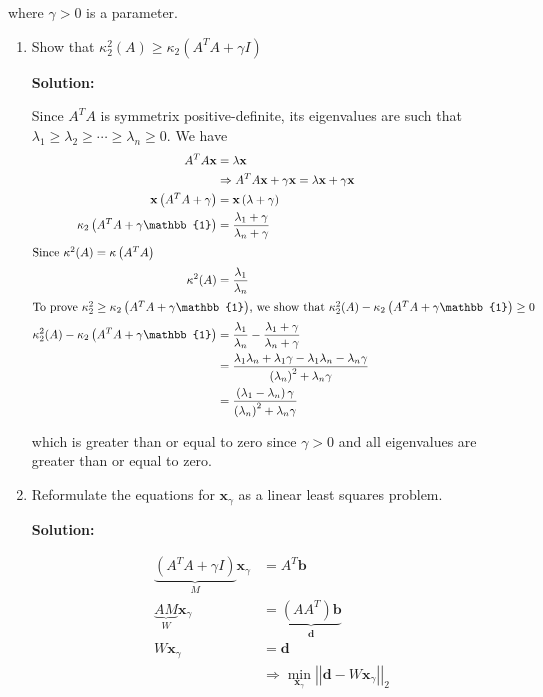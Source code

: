 \documentclass[12pt]{article}
\newcommand{\norm}[1]{\left|\left| #1 \right|\right|}
\newcommand{\vect}{\mathbf}
\newcommand{\Id}{\mathbb{1}}
\renewcommand{\P}[1]{\left( #1 \right)}
\begin{document}
\begin{enumerate}
where $\gamma > 0$ is a parameter.

\begin{enumerate}
  \item Show that $\kappa_{2}^{2}(A) \geq \kappa_{2}\left( A^{T}A + \gamma I \right)$

  {\bf Solution:}

  Since $A^{T}A$ is symmetrix positive-definite, its eigenvalues are such that
  $\lambda_{1} \geq \lambda_{2} \geq \cdots \geq \lambda_{n} \geq 0$. We have
  \begin{align*}
    A^{T}A\vect{x} &= \lambda\vect{x}\\
    &\Rightarrow A^{T}A\vect{x} + \gamma\vect{x} = \lambda\vect{x} + \gamma\vect{x}\\
    \vect{x} \P{A^{T}A + \gamma} &= \vect{x}\P{\lambda + \gamma}\\
    \kappa_{2}\P{A^{T}A + \gamma\Id} &= \frac{\lambda_{1} + \gamma}{\lambda_{n} + \gamma}\\
    \intertext{Since $\kappa^{2}(A) = \kappa\P{A^{T}A}$}
    \kappa^{2}(A) &= \frac{\lambda_{1}}{\lambda_{n}}\\
    \intertext{To prove $\kappa_{2}^{2} \geq \kappa_{2}\P{A^{T}A + \gamma\Id}$, we show that $\kappa_{2}^{2}(A) - \kappa_{2}\P{A^{T}A + \gamma\Id} \geq 0$}
    \kappa_{2}^{2}(A) - \kappa_{2}\P{A^{T}A + \gamma\Id} &= \frac{\lambda_{1}}{\lambda_{n}} - \frac{\lambda_{1} + \gamma}{\lambda_{n} + \gamma}\\
    &= \frac{\lambda_{1}\lambda_{n} + \lambda_{1}\gamma - \lambda_{1}\lambda_{n} - \lambda_{n}\gamma}{\P{\lambda_{n}}^{2} + \lambda_{n}\gamma}\\
    &= \frac{\P{\lambda_{1} - \lambda_{n}}\gamma}{\P{\lambda_{n}}^{2} + \lambda_{n}\gamma}
  \end{align*}

  which is greater than or equal to zero since $\gamma > 0$ and all eigenvalues are greater than or equal to zero.

  \item Reformulate the equations for $\mathbf{x}_{\gamma}$ as a linear least
  squares problem.

  {\bf Solution:}

  \begin{align*}
    \underbrace{\left( A^{T}A + \gamma I\right)}_{M}\mathbf{x}_{\gamma} &= A^{T}\mathbf{b}\\
    \underbrace{AM}_{W}\vect{x}_{\gamma} &= \underbrace{\P{AA^{T}}\vect{b}}_{\vect{d}}\\
    W\vect{x}_{\gamma} &= \vect{d}\\
    &\Rightarrow \min_{\vect{x}_{\gamma}}\norm{\vect{d} - W\vect{x}_{\gamma}}_{2}
  \end{align*}


\end{enumerate}
\end{enumerate}
\end{document}
